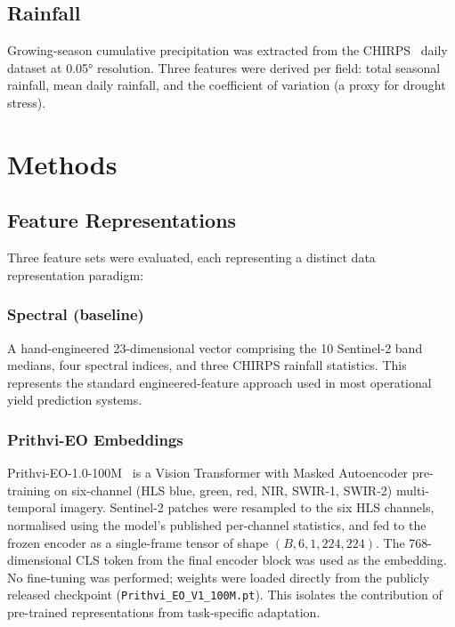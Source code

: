 \documentclass[journal]{IEEEtran}
\begin{document}
\subsection{Rainfall}

Growing-season cumulative precipitation was extracted from the CHIRPS~\cite{funk2015chirps}
daily dataset at 0.05° resolution. Three features were derived per field:
total seasonal rainfall, mean daily rainfall, and the coefficient of variation
(a proxy for drought stress).

\section{Methods}
\label{sec:methods}

\subsection{Feature Representations}

Three feature sets were evaluated, each representing a distinct
data representation paradigm:

\subsubsection{Spectral (baseline)}
A hand-engineered 23-dimensional vector comprising the 10 Sentinel-2 band medians,
four spectral indices, and three CHIRPS rainfall statistics.
This represents the standard engineered-feature approach used in most
operational yield prediction systems.

\subsubsection{Prithvi-EO Embeddings}
Prithvi-EO-1.0-100M~\cite{jakubik2023prithvi} is a Vision Transformer with
Masked Autoencoder pre-training on six-channel (HLS blue, green, red, NIR,
SWIR-1, SWIR-2) multi-temporal imagery.
Sentinel-2 patches were resampled to the six HLS channels, normalised using the
model's published per-channel statistics, and fed to the frozen encoder as
a single-frame tensor of shape $(B, 6, 1, 224, 224)$.
The 768-dimensional CLS token from the final encoder block was used as the embedding.
No fine-tuning was performed; weights were loaded directly from the
publicly released checkpoint (\texttt{Prithvi\_EO\_V1\_100M.pt}).
This isolates the contribution of pre-trained representations from
task-specific adaptation.
\end{document}
